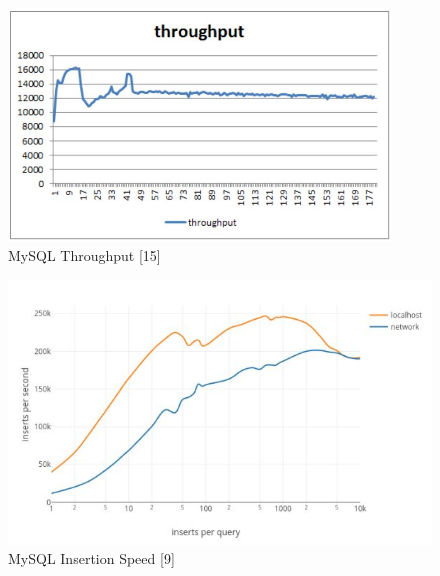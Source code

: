 \documentclass[12pt,journal,compsoc]{IEEEtran}
\newenvironment{subs}
  {\adjustwidth{1em}{0pt}}
  {\endadjustwidth}
\begin{document}
\begin{subs}
\begin{subs}
\begin{subs}
\begin{figure}[H]
\centering
\includegraphics[width=4in]{images/throughput.JPG}
\caption{MySQL Throughput [15]}
\label{fig:throughput}
\end{figure}

\begin{figure}[H]
\centering
\includegraphics[width=5in]{images/mysql_insert.JPG}
\caption{MySQL Insertion Speed [9]}
\label{fig:mysql_insert}
\end{figure}


\end{subs}
\end{subs}
\end{subs}
\end{document}
